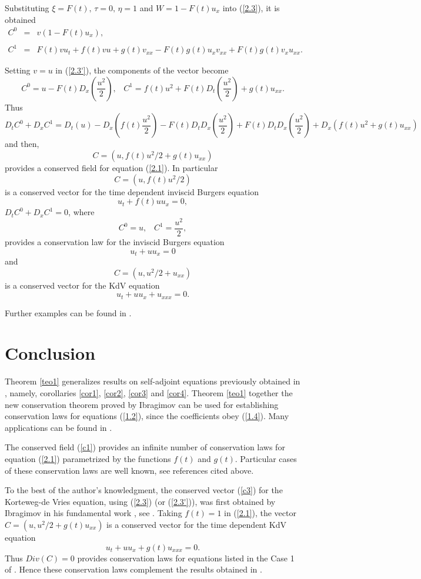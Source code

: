 \documentclass[11pt,letterpaper,twoside]{article}
\newcommand{\f}{\frac}
\newcommand{\bb}{\begin{equation}}
\newcommand{\ee}{\end{equation}}
\newcommand{\ba}{\begin{array}}
\newcommand{\ea}{\end{array}}
\begin{document}
Substituting $\xi=F(t),\,\tau=0,\,\eta=1$ and $W=1-F(t)u_{x}$ into (\ref{2.3}), it is obtained
\bb\label{2.3'}
\ba{lcl}
C^{0}&=&v(1-F(t)u_{x}),\\
\\
C^{1}&=&F(t)vu_{t}+f(t)vu+g(t)v_{xx}-F(t)g(t)u_{x}v_{xx}+F(t)g(t)v_{x}u_{xx}.
\ea
\ee

Setting $v=u$ in (\ref{2.3'}), the components of the vector become
$$C^{0}=u-F(t)D_{x}\left(\f{u^{2}}{2}\right),\,\,\,\,\,C^{1}=f(t)u^{2}+F(t)D_{t}\left(\f{u^{2}}{2}\right)+g(t)u_{xx}.$$
Thus
$$D_{t}C^{0}+D_{x}C^{1}=D_{t}(u)-D_{x}\left(f(t)\f{u^{2}}{2}\right)-F(t)D_{t}D_{x}\left(\f{u^{2}}{2}\right)+F(t)D_{t}D_{x}\left(\f{u^{2}}{2}\right)+D_{x}(f(t)u^{2}+g(t)u_{xx})$$
and then, 
\bb\label{c1}
C=(u,f(t)u^{2}/2+g(t)u_{xx})
\ee 
provides a conserved field for equation (\ref{2.1}). In particular 
\bb\label{c2}
C=(u,f(t)u^{2}/2)
\ee
is a conserved vector for the time dependent inviscid Burgers equation 
\bb\label{ibe1}
u_{t}+f(t)uu_{x}=0,
\ee
$D_{t}C^{0}+D_{x}C^{1}=0$, where
\bb\label{c3}
C^{0}=u,\,\,\,\,\,C^{1}=\f{u^{2}}{2},
\ee
provides a conservation law for the inviscid Burgers equation
\bb\label{ibe2}
u_{t}+uu_{x}=0
\ee
and 
\bb\label{c4}
C=(u,u^{2}/2+u_{xx})
\ee
is a conserved vector for the KdV equation
\bb\label{kdv}
u_{t}+uu_{x}+u_{xxx}=0.
\ee

Further examples can be found in \cite{ib1,ijnmp,i1,ib2,ib3}.

\section{Conclusion}

Theorem \ref{teo1} generalizes results on self-adjoint equations previously obtained in \cite{ib1,ijnmp,i1}, namely, corollaries \ref{cor1}, \ref{cor2}, \ref{cor3} and \ref{cor4}. Theorem \ref{teo1} together the new conservation theorem proved by Ibragimov \cite{ib2} can be used for establishing conservation laws for equations (\ref{1.2}), since the coefficients obey (\ref{1.4}). Many applications can be found in \cite{ib1, ijnmp, i1,ib2,ib3,jk3}. 

The conserved field (\ref{c1}) provides an infinite number of conservation laws for equation (\ref{2.1}) parametrized by the functions $f(t)$ and $g(t)$. Particular cases of these conservation laws are well known, see references cited above. 

To the best of the author's knowledgment, the conserved vector (\ref{c3}) for the Korteweg-de Vries equation, using (\ref{2.3}) (or (\ref{2.3'})), was first obtained by Ibragimov in his fundamental work \cite{ib2}, see \cite{i1}. Taking $f(t)=1$ in (\ref{2.1}), the vector $C=(u,u^{2}/2+g(t)u_{xx})$ is a conserved vector for the time dependent KdV equation
$$u_{t}+uu_{x}+g(t)u_{xxx}=0.$$
Thus $Div(C)=0$ provides conservation laws for equations listed in the Case 1 of \cite{jk2}. Hence these conservation laws complement the results obtained in \cite{jk3}.
\end{document}
